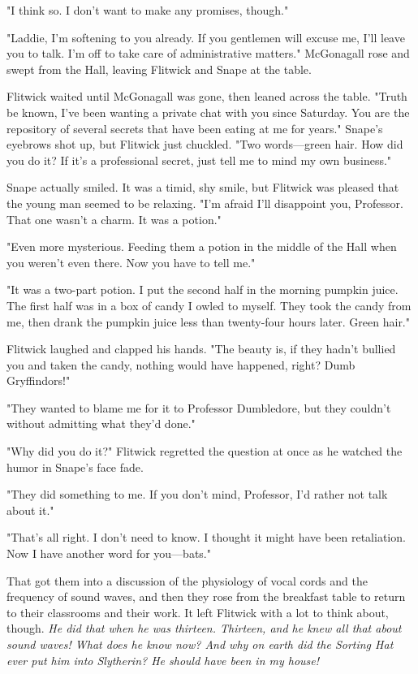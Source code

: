 "I think so. I don't want to make any promises, though."

"Laddie, I'm softening to you already. If you gentlemen will excuse me, I'll leave you to talk. I'm off to take care of administrative matters." McGonagall rose and swept from the Hall, leaving Flitwick and Snape at the table.

Flitwick waited until McGonagall was gone, then leaned across the table. "Truth be known, I've been wanting a private chat with you since Saturday. You are the repository of several secrets that have been eating at me for years." Snape's eyebrows shot up, but Flitwick just chuckled. "Two words—green hair. How did you do it? If it's a professional secret, just tell me to mind my own business."

Snape actually smiled. It was a timid, shy smile, but Flitwick was pleased that the young man seemed to be relaxing. "I'm afraid I'll disappoint you, Professor. That one wasn't a charm. It was a potion."

"Even more mysterious. Feeding them a potion in the middle of the Hall when you weren't even there. Now you have to tell me."

"It was a two-part potion. I put the second half in the morning pumpkin juice. The first half was in a box of candy I owled to myself. They took the candy from me, then drank the pumpkin juice less than twenty-four hours later. Green hair."

Flitwick laughed and clapped his hands. "The beauty is, if they hadn't bullied you and taken the candy, nothing would have happened, right? Dumb Gryffindors!"

"They wanted to blame me for it to Professor Dumbledore, but they couldn't without admitting what they'd done."

"Why did you do it?" Flitwick regretted the question at once as he watched the humor in Snape's face fade.

"They{\el} did something to me. If you don't mind, Professor, I'd rather not talk about it."

"That's all right. I don't need to know. I thought it might have been retaliation. Now I have another word for you—bats."

That got them into a discussion of the physiology of vocal cords and the frequency of sound waves, and then they rose from the breakfast table to return to their classrooms and their work. It left Flitwick with a lot to think about, though. \emph{He did that when he was thirteen. Thirteen, and he knew all that about sound waves! What does he know now? And why on earth did the Sorting Hat ever put him into Slytherin? He should have been in my house!}

